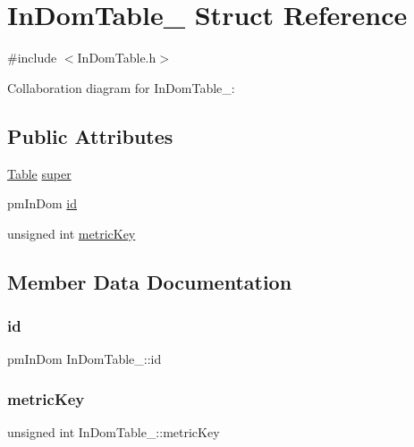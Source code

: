 \hypertarget{structInDomTable__}{}\section{In\+Dom\+Table\+\_\+ Struct Reference}
\label{structInDomTable__}


{\ttfamily \#include $<$In\+Dom\+Table.\+h$>$}



Collaboration diagram for In\+Dom\+Table\+\_\+\+:
\subsection*{Public Attributes}
\begin{DoxyCompactItemize}
\item 
\hyperlink{Table_8h_a799795dd983fdfee2e48cc52cdceb05d}{Table} \hyperlink{structInDomTable___af01cda0a37d9122921780ca48bcaab3e}{super}
\item 
pm\+In\+Dom \hyperlink{structInDomTable___a2c8fa3724b8bf97a17c9bfecb5bf10ed}{id}
\item 
unsigned int \hyperlink{structInDomTable___a5b4fbe040bb8b6c1df532236f013290e}{metric\+Key}
\end{DoxyCompactItemize}


\subsection{Member Data Documentation}
\mbox{\label{structInDomTable___a2c8fa3724b8bf97a17c9bfecb5bf10ed}} 
\subsubsection{\texorpdfstring{id}{id}}
{\footnotesize\ttfamily pm\+In\+Dom In\+Dom\+Table\+\_\+\+::id}

\mbox{\label{structInDomTable___a5b4fbe040bb8b6c1df532236f013290e}} 
\subsubsection{\texorpdfstring{metric\+Key}{metricKey}}
{\footnotesize\ttfamily unsigned int In\+Dom\+Table\+\_\+\+::metric\+Key}

